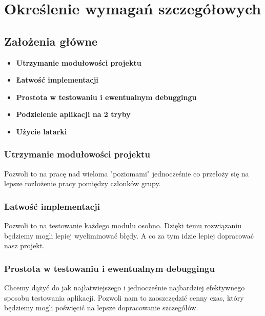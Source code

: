 \newpage
\section{Określenie wymagań szczegółowych}		%
\subsection{Założenia główne}
\begin{itemize}
\item \textbf{Utrzymanie modułowości projektu }
\item \textbf{Łatwość implementacji } 
\item   \textbf{Prostota w testowaniu i ewentualnym debuggingu}
\item \textbf{Podzielenie aplikacji na 2 tryby}
\item\textbf{ Użycie latarki}
\end{itemize}

\subsubsection{Utrzymanie modułowości projektu}
\hspace*{0.60cm}Pozwoli to na pracę nad wieloma "poziomami" jednocześnie co przełoży się na lepsze rozłożenie pracy pomiędzy członków grupy.

\subsubsection{Latwość implementacji}
\hspace*{0.60cm}Pozwoli to na testowanie każdego modułu osobno. Dzięki temu rozwiązaniu będziemy mogli lepiej wyeliminować błędy. A co za tym idzie lepiej dopracować nasz projekt.

\subsubsection{Prostota w testowaniu i ewentualnym debuggingu}
\hspace*{0.60cm}Chcemy dążyć do jak najłatwiejszego i jednocześnie najbardziej efektywnego sposobu testowania aplikacji. Pozwoli nam to zaoszczędzić cenny czas, który będziemy mogli poświęcić na lepsze dopracowanie szczegółów.

